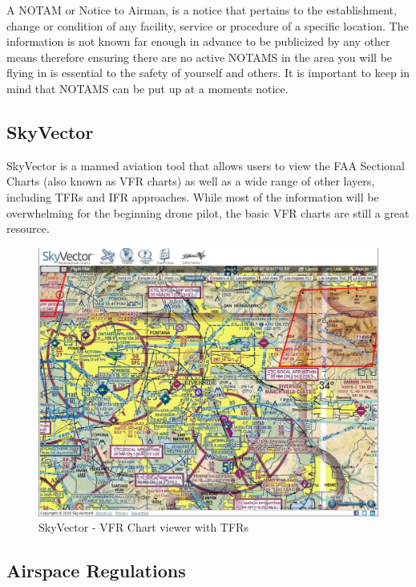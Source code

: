 \documentclass[
  12pt,
]{book}
\begin{document}
A NOTAM or Notice to Airman, is a notice that pertains to the establishment, change or condition of any facility, service or procedure of a specific location. The information is not known far enough in advance to be publicized by any other means therefore ensuring there are no active NOTAMS in the area you will be flying in is essential to the safety of yourself and others. It is important to keep in mind that NOTAMS can be put up at a moments notice.

\hypertarget{skyvector}{%
\subsection{SkyVector}\label{skyvector}}

SkyVector is a manned aviation tool that allows users to view the FAA Sectional Charts (also known as VFR charts) as well as a wide range of other layers, including TFRs and IFR approaches. While most of the information will be overwhelming for the beginning drone pilot, the basic VFR charts are still a great resource.

\begin{figure}

{\centering \includegraphics[width=0.9\linewidth]{images/skyvector} 

}

\caption{SkyVector - VFR Chart viewer with TFRs}\label{fig:skyvector}
\end{figure}

\hypertarget{airspace-regulations}{%
\subsection{Airspace Regulations}\label{airspace-regulations}}
\end{document}
